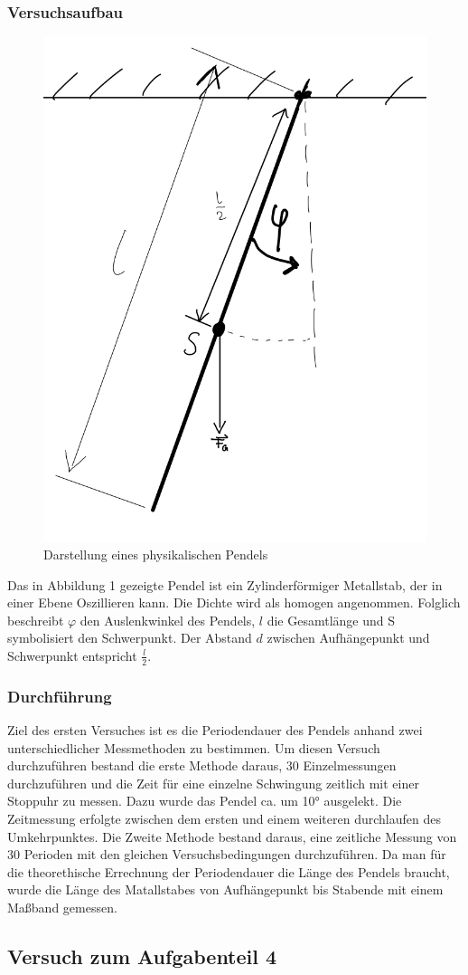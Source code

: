 \documentclass[11pt,a4paper]{article}
\begin{document}
      \subsubsection{Versuchsaufbau}
      \begin{figure}[h]
      	\includegraphics[width=0.4\linewidth]{physikalisches Pendel.png}
      	\centering
      	\caption{Darstellung eines physikalischen Pendels}
      \end{figure}
Das in Abbildung 1 gezeigte Pendel  ist ein Zylinderförmiger Metallstab, der in einer Ebene Oszillieren kann. Die Dichte wird als homogen angenommen. Folglich beschreibt $\varphi$  den Auslenkwinkel des Pendels, $l$ die Gesamtlänge und S symbolisiert den Schwerpunkt. Der Abstand $d$ zwischen Aufhängepunkt und Schwerpunkt entspricht $\frac{l}{2}$.
      \subsubsection{Durchführung}
Ziel des ersten Versuches ist es die Periodendauer des Pendels anhand zwei unterschiedlicher Messmethoden zu bestimmen.
 Um diesen Versuch durchzuführen bestand die erste Methode daraus, 30 Einzelmessungen durchzuführen und die Zeit für eine einzelne Schwingung zeitlich mit einer Stoppuhr zu messen.
  Dazu wurde das Pendel ca. um 10° ausgelekt. Die Zeitmessung erfolgte zwischen dem ersten und einem 
  weiteren durchlaufen des Umkehrpunktes.
   Die Zweite Methode bestand daraus, eine zeitliche Messung von 30 Perioden mit den gleichen Versuchsbedingungen durchzuführen.
    Da man für die theorethische Errechnung der Periodendauer die Länge des Pendels braucht, wurde die Länge des Matallstabes von Aufhängepunkt bis Stabende mit einem Maßband gemessen.
\subsection{Versuch zum Aufgabenteil 4}
\end{document}
